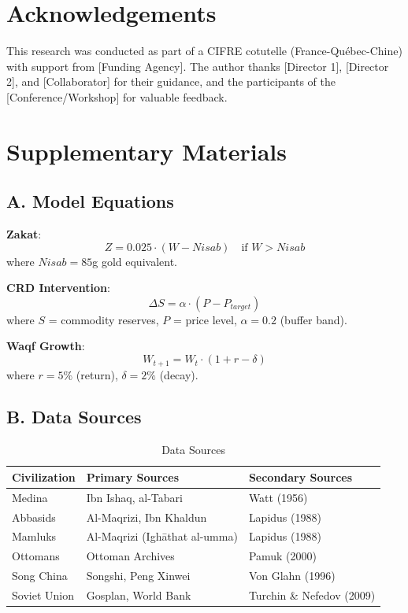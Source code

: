 \documentclass[12pt,a4paper]{article}
\begin{document}
\section*{Acknowledgements}

This research was conducted as part of a CIFRE cotutelle (France-Québec-Chine) with support from [Funding Agency]. The author thanks [Director 1], [Director 2], and [Collaborator] for their guidance, and the participants of the [Conference/Workshop] for valuable feedback.




\section*{Supplementary Materials}

\subsection*{A. Model Equations}

\textbf{Zakat}:
\begin{equation}
Z = 0.025 \cdot (W - Nisab) \quad \text{if } W > Nisab
\end{equation}
where $Nisab = 85$g gold equivalent.

\textbf{CRD Intervention}:
\begin{equation}
\Delta S = \alpha \cdot (P - P_{target})
\end{equation}
where $S$ = commodity reserves, $P$ = price level, $\alpha = 0.2$ (buffer band).

\textbf{Waqf Growth}:
\begin{equation}
W_{t+1} = W_t \cdot (1 + r - \delta)
\end{equation}
where $r = 5\%$ (return), $\delta = 2\%$ (decay).

\subsection*{B. Data Sources}

\begin{table}[H]
\centering
\caption{Data Sources}
\label{tab:sources}
\begin{tabular}{p{3cm} p{5cm} p{5cm}}
\toprule
\textbf{Civilization} & \textbf{Primary Sources} & \textbf{Secondary Sources} \\
\midrule
Medina & Ibn Ishaq, al-Tabari & Watt (1956) \\
Abbasids & Al-Maqrizi, Ibn Khaldun & Lapidus (1988) \\
Mamluks & Al-Maqrizi (Ighāthat al-umma) & Lapidus (1988) \\
Ottomans & Ottoman Archives & Pamuk (2000) \\
Song China & Songshi, Peng Xinwei & Von Glahn (1996) \\
Soviet Union & Gosplan, World Bank & Turchin \& Nefedov (2009) \\
\bottomrule
\end{tabular}
\end{table}
\end{document}
